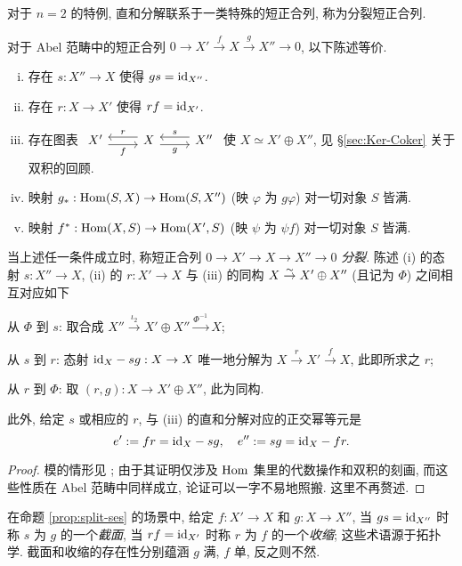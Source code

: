 对于 $n=2$ 的特例, 直和分解联系于一类特殊的短正合列, 称为分裂短正合列.

\begin{proposition}\label{prop:split-ses}
	对于 Abel 范畴中的短正合列 $0 \to X' \xrightarrow{f} X \xrightarrow{g} X'' \to 0$, 以下陈述等价.
	\begin{enumerate}[(i)]
		\item 存在 $s: X'' \to X$ 使得 $gs = \mathrm{id}_{X''}$.
		\item 存在 $r: X \to X'$ 使得 $rf = \mathrm{id}_{X'}$.
		\item 存在图表
		$\begin{tikzcd}
			X' \arrow[yshift=-0.7ex, r, "f"'] & X \arrow[yshift=0.7ex, l, "r"'] \arrow[yshift=-0.7ex, r, "g"'] & X'' \arrow[yshift=0.7ex, l, "s"']
		\end{tikzcd}$
		使 $X \simeq X' \oplus X''$, 见 \S\ref{sec:Ker-Coker} 关于双积的回顾.
		\item 映射 $g_*: \operatorname{Hom}(S, X) \to \operatorname{Hom}(S, X'')$ (映 $\varphi$ 为 $g\varphi$) 对一切对象 $S$ 皆满.
		\item 映射 $f^*: \operatorname{Hom}(X, S) \to \operatorname{Hom}(X', S)$ (映 $\psi$ 为 $\psi f$) 对一切对象 $S$ 皆满.
	\end{enumerate}
	当上述任一条件成立时, 称短正合列 $0 \to X' \to X \to X'' \to 0$ \emph{分裂}. 陈述 (i) 的态射 $s: X'' \to X$, (ii) 的 $r: X' \to X$ 与 (iii) 的同构 $X \stackrel{\sim}{\rightarrow} X' \oplus X''$ (且记为 $\Phi$) 之间相互对应如下
	\begin{compactitem}
		\item 从 $\Phi$ 到 $s$: 取合成 $X'' \xrightarrow{\iota_2} X' \oplus X'' \xrightarrow{\Phi^{-1}} X$;
		\item 从 $s$ 到 $r$: 态射 $\mathrm{id}_X - sg: X \to X$ 唯一地分解为 $X \xrightarrow{r} X' \xrightarrow{f} X$, 此即所求之 $r$;
		\item 从 $r$ 到 $\Phi$: 取 $(r, g): X \to X' \oplus X''$, 此为同构.
	\end{compactitem}

	此外, 给定 $s$ 或相应的 $r$, 与 (iii) 的直和分解对应的正交幂等元是
	\[ e' := fr = \mathrm{id}_X - sg, \quad e'' := sg = \mathrm{id}_X - fr. \]
\end{proposition}
\begin{proof}
	模的情形见 \cite[命题 6.8.5]{Li1}; 由于其证明仅涉及 $\operatorname{Hom}$ 集里的代数操作和双积的刻画, 而这些性质在 Abel 范畴中同样成立, 论证可以一字不易地照搬. 这里不再赘述.
\end{proof}

在命题 \ref{prop:split-ses} 的场景中, 给定 $f: X' \to X$ 和 $g: X \to X''$, 当 $gs = \mathrm{id}_{X''}$ 时称 $s$ 为 $g$ 的一个\emph{截面}, 当 $rf = \mathrm{id}_{X'}$ 时称 $r$ 为 $f$ 的一个\emph{收缩}; 这些术语源于拓扑学. 截面和收缩的存在性分别蕴涵 $g$ 满, $f$ 单, 反之则不然.


